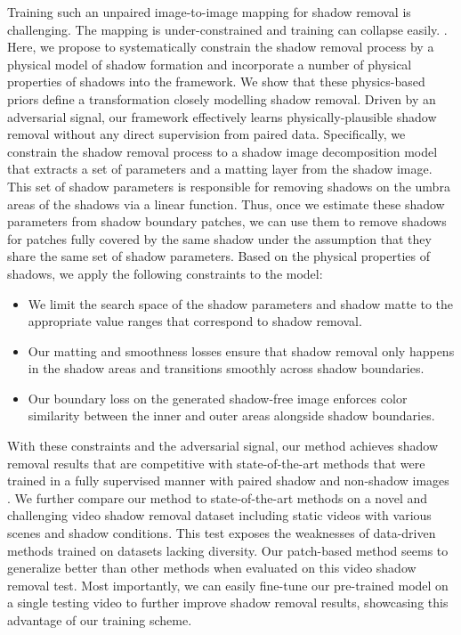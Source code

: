 \documentclass[runningheads]{llncs}
\begin{document}
Training such an unpaired image-to-image mapping for shadow removal is challenging. The mapping is under-constrained and  training can collapse easily. \cite{gulrajani2017improved,liu2018two,Liu_2019_ICCV,Mescheder2018ICML,thanh2019improving,miyato2018spectral}. Here, we propose to systematically constrain the shadow removal process by a physical model of shadow formation \cite{Shor08} and incorporate a number of physical properties of shadows into the framework. We show that these physics-based priors define a transformation closely modelling shadow removal. Driven by an adversarial signal, our framework effectively learns physically-plausible shadow removal without any direct supervision from paired data. Specifically, we constrain the shadow removal process to a shadow image decomposition model \cite{Le-etal-ICCV19} that extracts  a set of parameters and a matting layer from the shadow image. This set of shadow parameters is responsible for removing shadows on the umbra areas of the shadows via a linear function. Thus, once we estimate these shadow parameters from shadow boundary patches, we can use them to remove shadows for patches fully covered by the same shadow under the assumption that they share the same set of shadow parameters. Based on the physical properties of shadows, we apply the following constraints to the model:
\begin{itemize}
    \item We limit the search space of the shadow parameters and shadow matte to the appropriate value ranges that correspond to shadow removal.
    \item Our matting and smoothness losses  ensure that  shadow removal only happens in the shadow areas and transitions smoothly across shadow boundaries.
    \item Our boundary loss on the generated shadow-free image enforces  color similarity between the inner and outer areas alongside shadow boundaries.
\end{itemize}
 
 
 
With these constraints and the adversarial signal, our method achieves  shadow removal results that are competitive with state-of-the-art  methods that were trained in a fully supervised manner with paired shadow and non-shadow images \cite{Le-etal-ICCV19,Wang_2018_CVPR,Qu_2017_CVPR}. We further compare our method to state-of-the-art methods on a novel and challenging video shadow removal dataset including static videos with various scenes and shadow conditions. This test exposes the weaknesses of data-driven methods trained on datasets lacking diversity. Our patch-based method seems to generalize better than other methods when evaluated on this video shadow removal test. Most importantly, we can easily fine-tune our pre-trained model on a single testing video to further improve  shadow removal results, showcasing this advantage of our training scheme. 
\end{document}
